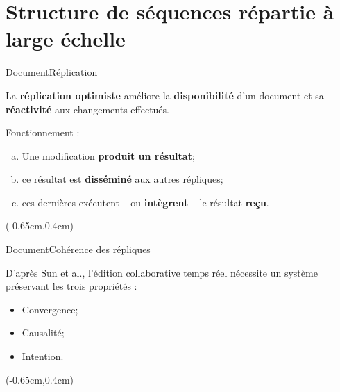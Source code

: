 \section{Structure de séquences répartie à large échelle}


\begin{frame}{Document}{Réplication}
  \vspace{-1.5cm}

  La \textbf{réplication optimiste} améliore
  la \textbf{disponibilité} d'un document et sa \textbf{réactivité} aux
  changements effectués.  \vspace{0.75cm}

  Fonctionnement :
  \begin{enumerate}[(a)]
  \item Une modification \textbf{produit un résultat};
  \item ce résultat est \textbf{disséminé} aux autres répliques;
  \item ces dernières exécutent -- ou \textbf{intègrent} -- le résultat
    \textbf{reçu}.
  \end{enumerate}

  \begin{textblock*}{\textwidth}(-0.65cm,0.4cm) 
    
  \end{textblock*}
  
  \vspace{1cm}

\end{frame}


\begin{frame}{Document}{Cohérence des répliques}
  
  \vspace{-1.5cm}

  D'après Sun et al., l'édition collaborative
  temps réel nécessite un système préservant les trois propriétés :

  \begin{itemize}
  \item Convergence;
  \item Causalité;
  \item Intention.  
  \end{itemize}

  \begin{textblock*}{\textwidth}(-0.65cm,0.4cm) 
    
  \end{textblock*}

\end{frame}


